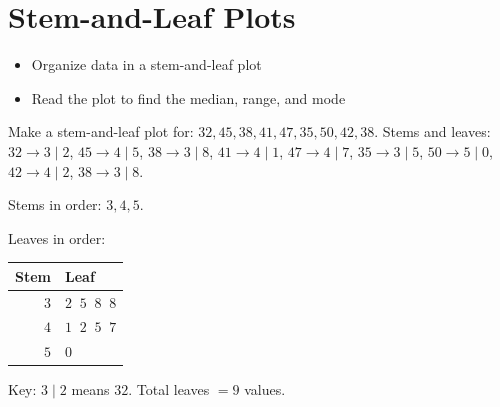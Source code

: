 \section{Stem-and-Leaf Plots}

\begin{stepGoal}
\begin{itemize}
    \item Organize data in a stem-and-leaf plot
    \item Read the plot to find the median, range, and mode
\end{itemize}
\end{stepGoal}

\begin{stepVocabBox}
\end{stepVocabBox}

\begin{stepsCard}
\end{stepsCard}

\begin{stepExample}{Make a stem-and-leaf plot for: $32, 45, 38, 41, 47, 35, 50, 42, 38$.}
     Stems and leaves: $32 \to 3 \mid 2$, $45 \to 4 \mid 5$, $38 \to 3 \mid 8$, $41 \to 4 \mid 1$, $47 \to 4 \mid 7$, $35 \to 3 \mid 5$, $50 \to 5 \mid 0$, $42 \to 4 \mid 2$, $38 \to 3 \mid 8$.

     Stems in order: $3, 4, 5$.

     Leaves in order:

    \begin{center}
    \begin{tabular}{r|l}
        \textbf{Stem} & \textbf{Leaf} \\
        \hline
        $3$ & $2\;\;5\;\;8\;\;8$ \\
        $4$ & $1\;\;2\;\;5\;\;7$ \\
        $5$ & $0$
    \end{tabular}
    \end{center}

     Key: $3 \mid 2$ means $32$. Total leaves $= 9$ values.
\end{stepExample}

